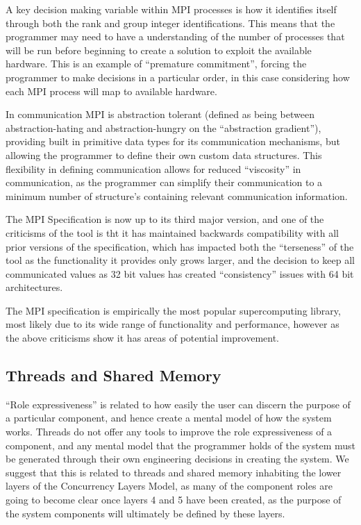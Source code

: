 \documentclass{sig-alternate}
\begin{document}
A key decision making variable within MPI processes is how it identifies itself through both the rank and group integer identifications. This means that the programmer may need to have a understanding of the number of processes that will be run before beginning to create a solution to exploit the available hardware. This is an example of ``premature commitment'', forcing the programmer to make decisions in a particular order, in this case considering how each MPI process will map to available hardware.

In communication MPI is abstraction tolerant (defined as being between abstraction-hating and abstraction-hungry on the ``abstraction gradient''), providing built in primitive data types for its communication mechanisms, but allowing the programmer to define their own custom data structures. This flexibility in defining communication allows for reduced ``viscosity'' in communication, as the programmer can simplify their communication to a minimum number of structure's containing relevant communication information.

The MPI Specification is now up to its third major version, and one of the criticisms of the tool is tht it has maintained backwards compatibility with all prior versions of the specification, which has impacted both the ``terseness'' of the tool as the functionality it provides only grows larger, and the decision to keep all communicated values as 32 bit values has created ``consistency'' issues with 64 bit architectures.

The MPI specification is empirically the most popular supercomputing library, most likely due to its wide range of functionality and performance, however as the above criticisms show it has areas of potential improvement. 

\subsection{Threads and Shared Memory}
``Role expressiveness'' is related to how easily the user can discern the purpose of a particular component, and hence create a mental model of how the system works. Threads do not offer any tools to improve the role expressiveness of a component, and any mental model that the programmer holds of the system must be generated through their own engineering decisions in creating the system. We suggest that this is related to threads and shared memory inhabiting the lower layers of the Concurrency Layers Model, as many of the component roles are going to become clear once layers 4 and 5 have been created, as the purpose of the system components will ultimately be defined by these layers.
\end{document}

